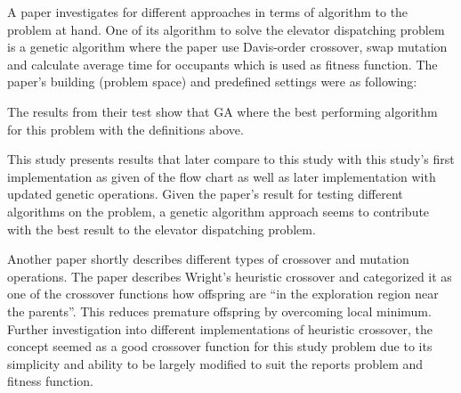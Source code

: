 A paper\cite{ahmed2022investigation} investigates for different approaches in terms of algorithm to the problem at hand. One of its algorithm to solve the elevator dispatching problem is a genetic algorithm where the paper use Davis-order crossover, swap mutation and calculate average time for occupants  which is used as fitness function. The paper's building (problem space) and predefined settings were as following:

The results from their test show that GA where the best performing algorithm for this problem with the definitions above.

This study presents results that later compare to this study with this study's first implementation as given of the flow chart \cite{tartan2016genetic} as well as later implementation with updated genetic operations. Given the paper's result for testing different algorithms on the problem, a genetic algorithm approach seems to contribute with the best result to the elevator dispatching problem.

Another paper\cite{lim2017crossover} shortly describes different types of crossover and mutation operations. The paper describes Wright's heuristic crossover and categorized it as one of the crossover functions how offspring are “in the exploration region near the parents”\cite{lim2017crossover}. This reduces premature offspring by overcoming local minimum. Further investigation into different implementations of heuristic crossover, the concept seemed as a good crossover function for this study problem due to its simplicity and ability to be largely modified to suit the reports problem and fitness function.


